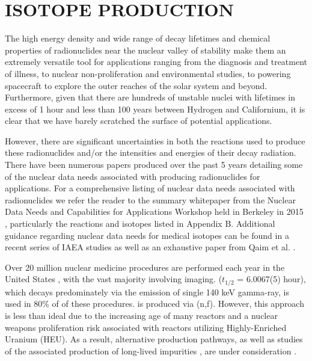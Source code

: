 \documentclass[letterpaper]{ar-1col}
\begin{document}
\section{ISOTOPE PRODUCTION}\label{sec:isotope_production}


The high energy density and wide range of decay lifetimes and chemical properties of radionuclides near the nuclear valley of stability make them an extremely versatile tool for applications ranging from the diagnosis and treatment of illness, to nuclear non-proliferation and environmental studies, to powering spacecraft to explore the outer reaches of the solar system and beyond.
Furthermore, given that there are hundreds of unstable nuclei with lifetimes in excess of 1 hour and less than 100 years between Hydrogen and Californium, it is clear that we have barely scratched the surface of potential applications.

However, there are significant uncertainties in both the reactions used to produce these radionuclides and/or the intensities and energies of their decay radiation.
 There have been numerous papers produced over the past 5 years detailing some of the nuclear data needs associated with producing radionuclides for applications.
For a comprehensive listing of nuclear data needs associated with radionuclides we refer the reader to the summary whitepaper from the Nuclear Data Needs and Capabilities for Applications Workshop held in Berkeley in 2015 \cite{bernstein2015nuclear}, particularly the reactions and isotopes listed in Appendix B.
 Additional guidance regarding nuclear data needs for medical isotopes can be found in a recent series of IAEA studies \cite{Iae675,Iae596,Iae591} as well as an exhaustive paper from Qaim et al. \cite{Qaim201731}.

Over 20 million nuclear medicine procedures are performed each year in the United States \cite{Met09}, with the vast majority involving imaging.
  ($t_{1/2}$ = 6.0067(5) hour), which decays predominately via the emission of single 140 keV gamma-ray, is used in 80\% of of these procedures.
 is produced via (n,f).
 However, this approach is less than ideal due to the increasing age of many reactors \cite{Qai12} and a nuclear weapons proliferation risk associated with reactors utilizing Highly-Enriched Uranium (HEU).
 As a result, alternative  production pathways, as well as studies of the associated production of long-lived impurities \cite{Updegraff2013}, are under consideration \cite{Rut09}.
\end{document}
